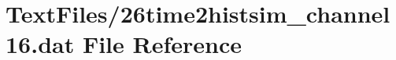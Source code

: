 \hypertarget{26time2histsim__channel16_8dat}{}\section{Text\+Files/26time2histsim\+\_\+channel16.dat File Reference}
\label{26time2histsim__channel16_8dat}
